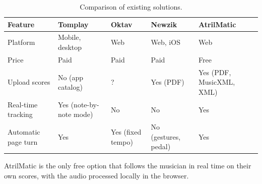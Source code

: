 \begin{table}[H]
	\centering
	\begin{tabularx}{\textwidth}{l Y Y Y Y}
		\toprule
		\textbf{Feature} 	& \textbf{Tomplay} 			& \textbf{Oktav} 	& \textbf{Newzik} 		& \textbf{AtrilMatic} \\
		\midrule
		Platform			& Mobile, desktop			& Web 				& Web, iOS				& Web \\
		Price				& Paid 						& Paid 				& Paid 					& Free \\
		Upload scores		& No (app catalog) 			& ? 				& Yes (PDF) 			& Yes (PDF, MusicXML, XML) \\
		Real-time tracking	& Yes (note-by-note mode) 	& No 				& No 					& Yes \\
		Automatic page turn	& Yes 						& Yes (fixed tempo) & No (gestures, pedal) 	& Yes \\
		\bottomrule
	\end{tabularx}
	\caption{Comparison of existing solutions.}
	\label{tab:existing-solutions}
\end{table}

AtrilMatic is the only free option that follows the musician in real time on their own scores, 
with the audio processed locally in the browser.
